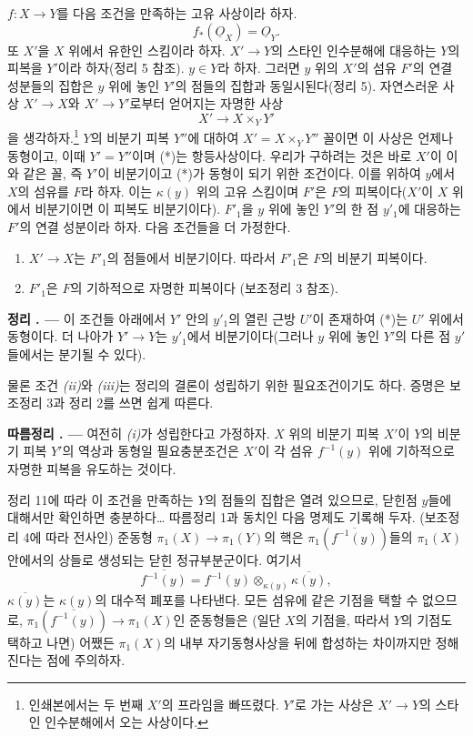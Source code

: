 \documentclass[11pt,twoside,openany]{book}
\numberwithin{equation}{section}
\newcommand{\sourceunit}{front}
\newcommand{\src}[1]{%
  \phantomsection\hypertarget{src:\sourceunit:#1}{}%
  \marginpar{\raggedleft\footnotesize\sffamily #1}%
}
\newcommand{\Osh}{\underline{O}}
\theoremstyle{plain}
\theoremstyle{definition}
\theoremstyle{remark}
\newcommand{\result}[2]{%
  \par\medskip\noindent\textbf{#1%
  \if\relax\detokenize{#2}\relax\else\space#2\fi. ---}\enspace
}
\begin{document}
$f:X\longrightarrow Y$를 다음 조건을 만족하는 고유 사상이라 하자.
\begin{equation}
  \tag{i}
  f_*(\Osh_X)=\Osh_Y.
\end{equation}
또 $X'$을 $X$ 위에서 유한인 스킴이라 하자. $X'\longrightarrow Y$의
스타인 인수분해에 대응하는 $Y$의 피복을 $Y'$이라 하자(정리 5 참조).
$y\in Y$라 하자. 그러면 $y$ 위의 $X'$의 섬유 $F'$의 연결 성분들의
집합은 $y$ 위에 놓인 $Y'$의 점들의 집합과 동일시된다(정리 5). 자연스러운
사상 $X'\longrightarrow X$와
$X'\longrightarrow Y'$로부터 얻어지는 자명한 사상
\begin{equation}
  \tag{*}
  X'\longrightarrow X\times_Y Y'
\end{equation}
을 생각하자.\footnote{인쇄본에서는 두 번째 $X'$의 프라임을 빠뜨렸다.
$Y'$로 가는 사상은 $X'\to Y$의 스타인 인수분해에서 오는 사상이다.}
$Y$의 비분기 피복 $Y''$에 대하여 $X'=X\times_Y Y''$ 꼴이면 이 사상은
언제나 동형이고, 이때 $Y'=Y''$이며 (*)는 항등사상이다. 우리가 구하려는
것은 바로 $X'$이 이와 같은 꼴, 즉 $Y'$이 비분기이고 (*)가 동형이 되기
위한 조건이다. 이를 위하여 $y$에서 $X$의 섬유를 $F$라 하자. 이는
$\kappa(y)$ 위의 고유 스킴이며 $F'$은 $F$의 피복이다($X'$이 $X$ 위에서
비분기이면 이 피복도 비분기이다). $F'_1$을 $y$ 위에 놓인 $Y'$의 한 점
$y'_1$에 대응하는 $F'$의 연결 성분이라 하자. 다음 조건들을 더 가정한다.
\begin{enumerate}
  \item[\textit{(ii)}] $X'\longrightarrow X$는 $F'_1$의 점들에서
    비분기이다. 따라서 $F'_1$은 $F$의 비분기 피복이다.
  \item[\textit{(iii)}] $F'_1$은 $F$의 기하적으로 자명한 피복이다
    (보조정리 3 참조).
\end{enumerate}

\result{정리}{11} 이 조건들 아래에서 $Y'$ 안의 $y'_1$의 열린 근방
$U'$이 존재하여 (*)는 $U'$ 위에서 동형이다. 더 나아가
$Y'\longrightarrow Y$는 $y'_1$에서 비분기이다(그러나 $y$ 위에 놓인
$Y'$의 다른 점 $y'$들에서는 분기될 수 있다).

물론 조건 \textit{(ii)}와 \textit{(iii)}는 정리의 결론이 성립하기
위한 필요조건이기도 하다. 증명은 보조정리 3과 정리 2를 쓰면 쉽게 따른다.

\src{214}
\result{따름정리}{1} 여전히 \textit{(i)}가 성립한다고 가정하자. $X$ 위의
비분기 피복 $X'$이 $Y$의 비분기 피복 $Y'$의 역상과 동형일 필요충분조건은
$X'$이 각 섬유 $f^{-1}(y)$ 위에 기하적으로 자명한 피복을 유도하는 것이다.

정리 11에 따라 이 조건을 만족하는 $Y$의 점들의 집합은 열려 있으므로,
닫힌점 $y$들에 대해서만 확인하면 충분하다\ldots{} 따름정리 1과 동치인
다음 명제도 기록해 두자. (보조정리 4에 따라 전사인) 준동형
$\pi_1(X)\longrightarrow\pi_1(Y)$의 핵은
$\pi_1(\overline{f^{-1}(y)})$들의 $\pi_1(X)$ 안에서의 상들로 생성되는
닫힌 정규부분군이다. 여기서
\[
  \overline{f^{-1}(y)}
  =f^{-1}(y)\otimes_{\kappa(y)}\overline{\kappa(y)},
\]
$\overline{\kappa(y)}$는 $\kappa(y)$의 대수적 폐포를 나타낸다. 모든
섬유에 같은 기점을 택할 수 없으므로,
$\pi_1(\overline{f^{-1}(y)})\longrightarrow\pi_1(X)$인 준동형들은
(일단 $X$의 기점을, 따라서 $Y$의 기점도 택하고 나면) 어쨌든
$\pi_1(X)$의 내부 자기동형사상을 뒤에 합성하는 차이까지만 정해진다는
점에 주의하자.
\end{document}
